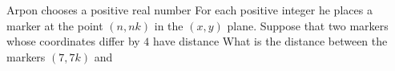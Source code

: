 Arpon chooses a positive real number  For each positive integer  he places a marker at the point $(n,nk)$ in the $(x,y)$ plane. Suppose that two markers whose coordinates differ by $4$ have distance  What is the distance between the markers $(7,7k)$ and 